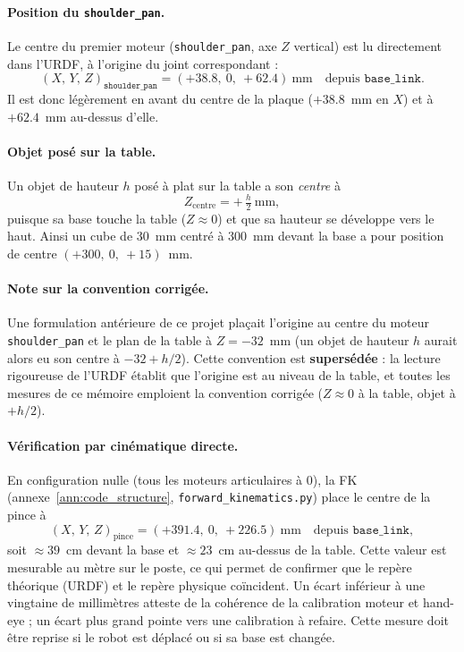 \paragraph{Position du \texttt{shoulder\_pan}.}
Le centre du premier moteur (\texttt{shoulder\_pan}, axe $Z$ vertical) est lu
directement dans l'URDF, à l'origine du joint correspondant :
\[
(X,\,Y,\,Z)_{\texttt{shoulder\_pan}} = (+38.8,\ 0,\ +62.4)\ \text{mm}
\quad\text{depuis } \texttt{base\_link}.
\]
Il est donc légèrement en avant du centre de la plaque ($+38.8$~mm en $X$) et
à $+62.4$~mm au-dessus d'elle.

\paragraph{Objet posé sur la table.}
Un objet de hauteur $h$ posé à plat sur la table a son \emph{centre} à
\[
Z_{\text{centre}} = +\,\tfrac{h}{2}\ \text{mm},
\]
puisque sa base touche la table ($Z \approx 0$) et que sa hauteur se développe
vers le haut. Ainsi un cube de $30$~mm centré à $300$~mm devant la base a pour
position de centre $(+300,\ 0,\ +15)$~mm.

\paragraph{Note sur la convention corrigée.}
Une formulation antérieure de ce projet plaçait l'origine au centre du moteur
\texttt{shoulder\_pan} et le plan de la table à $Z = -32$~mm (un objet de
hauteur $h$ aurait alors eu son centre à $-32 + h/2$). Cette convention est
\textbf{supersédée} : la lecture rigoureuse de l'URDF établit que l'origine
est au niveau de la table, et toutes les mesures de ce mémoire emploient la
convention corrigée ($Z \approx 0$ à la table, objet à $+h/2$).

\paragraph{Vérification par cinématique directe.}
En configuration nulle (tous les moteurs articulaires à $0$\textdegree{}), la
FK (annexe~\ref{ann:code_structure}, \texttt{forward\_kinematics.py}) place le
centre de la pince à
\[
(X,\,Y,\,Z)_{\text{pince}} = (+391.4,\ 0,\ +226.5)\ \text{mm}
\quad\text{depuis } \texttt{base\_link},
\]
soit $\approx 39$~cm devant la base et $\approx 23$~cm au-dessus de la table.
Cette valeur est mesurable au mètre sur le poste, ce qui permet de confirmer
que le repère théorique (URDF) et le repère physique coïncident. Un écart
inférieur à une vingtaine de millimètres atteste de la cohérence de la
calibration moteur et hand-eye ; un écart plus grand pointe vers une
calibration à refaire. Cette mesure doit être reprise si le robot est déplacé
ou si sa base est changée.

